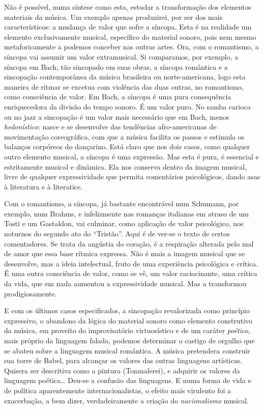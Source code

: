 Não é possível, numa síntese como esta, estudar a transformação dos
elementos materiais da música. Um exemplo apenas produzirei, por ser dos
mais característicos: a mudança de valor que sofre a síncopa. Esta é na
realidade um elemento exclusivamente musical, específico do material
sonoro, pois nem mesmo metaforicamente a podemos conceber nas outras
artes. Ora, com o romantismo, a síncopa vai assumir um valor
extramusical. Si comparamos, por exemplo, a síncopa em Bach, tão
sincopado em suas obras, a síncopa romântica e a sincopação
contemporânea da música brasileira ou norte-americana, logo esta maneira
de ritmar se excetua com violência das duas outras, no romantismo, como
consciência de valor. Em Bach, a síncopa é uma pura consequência
enriquecedora da divisão do tempo sonoro. É um valor puro. No samba
carioca ou no jazz a sincopação é um valor mais necessário que em Bach,
menos \textit{hedonístico}: nasce e se desenvolve das tendências
afro-americanas de movimentação coreográfica, com que a música facilita
os passos e estimula os balanços corpóreos do dançarino. Está claro que
nos dois casos, como qualquer outro elemento musical, a síncopa é uma
expressão. Mas esta é pura, é essencial e estritamente musical e
dinâmica. Ela nos conserva dentro da imagem musical, livre de qualquer
expressividade que permita comentários psicológicos, dando asas à
literatura e à literatice.

Com o romantismo, a síncopa, já bastante encontrável num Schumann, por
exemplo, num Brahms, e infelizmente nas romanças italianas em atraso de
um Tosti e um Gastaldon, vai culminar, como aplicação de valor
psicológico, nos noturnos do segundo ato do ``Tristão''. Aqui é de ver-se o
texto de certos comentadores. Se trata da angústia do coração, é a
respiração alterada pelo mal de amor que essa base rítmica expressa. Não
é mais a imagem musical que se desenvolve, mas a ideia intelectual,
fruto de uma experiência psicológica e crítica. É uma outra consciência
de valor, como se vê, um valor raciocinante, uma crítica da vida, que em
nada aumentou a expressividade musical. Mas a transformou
prodigiosamente.

E com os últimos casos especificados, a sincopação revalorizada como
princípio expressivo, o abandono da lógica do material sonoro como
elemento construtivo da música, em proveito do improvisatório
virtuosístico e de um caráter \textit{poético}, mais próprio da linguagem
falada, podemos determinar o castigo de orgulho que se abateu sobre a
linguagem musical romântica. A música pretendera construir sua torre de
Babel, para alcançar os valores das outras linguagens artísticas.
Quisera ser descritiva como a pintura (Tonmalerei), e adquirir os
valores da linguagem poética\ldots{} Deu-se a confusão das linguagens. E numa
forma de vida e de política aparentemente internacionalistas, o efeito
mais virulento foi a exacerbação, a bem dizer, verdadeiramente a criação
do \textit{nacionalismo} musical.

